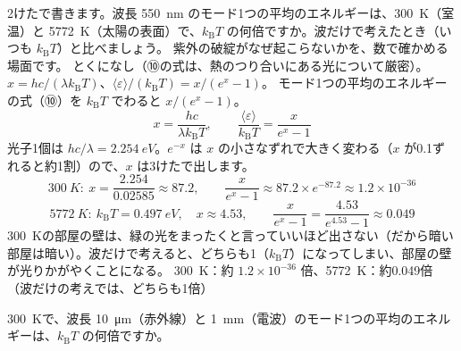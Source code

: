 \label{ph:原-2:ex11}
\begin{phreidai}
2けたで書きます。波長 \qty{550}{nm} のモード1つの平均のエネルギーは、\qty{300}{K}（室温）と \qty{5772}{K}（太陽の表面）で、$k_{\mathrm B}T$ の何倍ですか。波だけで考えたとき（いつも $k_{\mathrm B}T$）と比べましょう。
\phbamen
紫外の破綻がなぜ起こらないかを、数で確かめる場面です。
\phmushi
とくになし（⑩の式は、熱のつり合いにある光について厳密）。
\phzu
$x=hc/(\lambda k_{\mathrm B}T)$、$\langle\varepsilon\rangle/(k_{\mathrm B}T)=x/(e^x-1)$。
\phriyu
モード1つの平均のエネルギーの式（⑩）を $k_{\mathrm B}T$ でわると $x/(e^x-1)$。
\phtateru
\[ x=\frac{hc}{\lambda k_{\mathrm B}T},\qquad\frac{\langle\varepsilon\rangle}{k_{\mathrm B}T}=\frac{x}{e^x-1} \]
\phtoku
光子1個は $hc/\lambda=\qty{2.254}{eV}$。$e^{-x}$ は $x$ の小さなずれで大きく変わる（$x$ が0.1ずれると約1割）ので、$x$ は3けたで出します。
\[ \qty{300}{K}:\ x=\frac{2.254}{0.02585}\approx87.2,\qquad\frac{x}{e^x-1}\approx87.2\times e^{-87.2}\approx1.2\times10^{-36} \]
\[ \qty{5772}{K}:\ k_{\mathrm B}T=\qty{0.497}{eV},\quad x\approx4.53,\qquad\frac{x}{e^x-1}=\frac{4.53}{e^{4.53}-1}\approx0.049 \]
\phtashikame
\qty{300}{K}の部屋の壁は、緑の光をまったくと言っていいほど出さない（だから暗い部屋は暗い）。波だけで考えると、どちらも1（$k_{\mathrm B}T$）になってしまい、部屋の壁が光りかがやくことになる。
\kotae \qty{300}{K}：約 $1.2\times10^{-36}$ 倍、\qty{5772}{K}：約0.049倍（波だけの考えでは、どちらも1倍）
\end{phreidai}
\begin{jibun}
\qty{300}{K}で、波長 \qty{10}{\micro m}（赤外線）と \qty{1}{mm}（電波）のモード1つの平均のエネルギーは、$k_{\mathrm B}T$ の何倍ですか。
\end{jibun}

